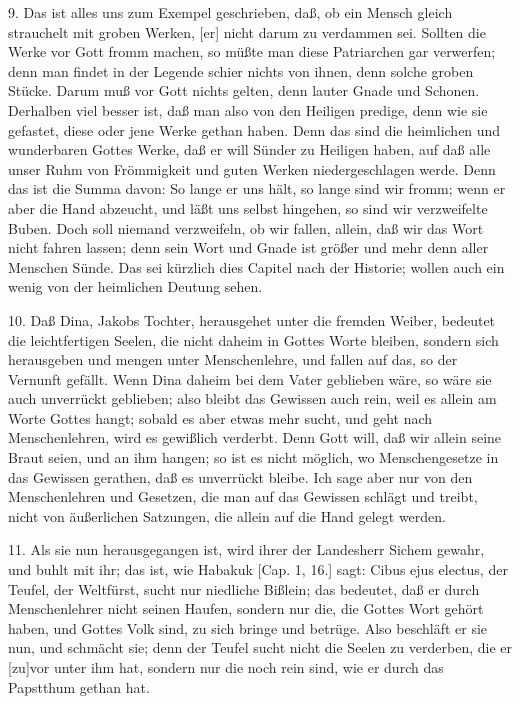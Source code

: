 9. Das ist alles uns zum Exempel geschrieben, daß, ob ein Mensch gleich strauchelt mit groben Werken, [er] nicht darum zu verdammen sei. Sollten die Werke vor Gott fromm machen, so müßte man diese Patriarchen gar verwerfen; denn man findet in der Legende schier nichts von ihnen, denn solche groben Stücke. Darum muß vor Gott nichts gelten, denn lauter Gnade und Schonen. Derhalben viel besser ist, daß man also von den Heiligen predige, denn wie sie gefastet, diese oder jene Werke gethan haben. Denn das sind die heimlichen und wunderbaren Gottes Werke, daß er will Sünder zu Heiligen haben, auf daß alle unser Ruhm von Frömmigkeit und guten Werken niedergeschlagen werde. Denn das ist die Summa davon: So lange er uns hält, so lange sind wir fromm; wenn er aber die Hand abzeucht, und läßt uns selbst hingehen, so sind wir verzweifelte Buben. Doch soll niemand verzweifeln, ob wir fallen, allein, daß wir das Wort nicht fahren lassen; denn sein Wort und Gnade ist größer und mehr denn aller Menschen Sünde. Das sei kürzlich dies Capitel nach der Historie; wollen auch ein wenig von der heimlichen Deutung sehen.

10. Daß Dina, Jakobs Tochter, herausgehet unter die fremden Weiber, bedeutet die leichtfertigen Seelen, die nicht daheim in Gottes Worte bleiben, sondern sich herausgeben und mengen unter Menschenlehre, und fallen auf das, so der Vernunft gefällt. Wenn Dina daheim bei dem Vater geblieben wäre, so wäre sie auch unverrückt geblieben; also bleibt das Gewissen auch rein, weil es allein am Worte Gottes hangt; sobald es aber etwas mehr sucht, und geht nach Menschenlehren, wird es gewißlich verderbt. Denn Gott will, daß wir allein seine Braut seien, und an ihm hangen; so ist es nicht möglich, wo Menschengesetze in das Gewissen gerathen, daß es unverrückt bleibe. Ich sage aber nur von den Menschenlehren und Gesetzen, die man auf das Gewissen schlägt und treibt, nicht von äußerlichen Satzungen, die allein auf die Hand gelegt werden.

11. Als sie nun herausgegangen ist, wird ihrer der Landesherr Sichem gewahr, und buhlt mit ihr; das ist, wie Habakuk [Cap. 1, 16.] sagt: Cibus ejus electus, der Teufel, der Weltfürst, sucht nur niedliche Bißlein; das bedeutet, daß er durch Menschenlehrer nicht seinen Haufen, sondern nur die, die Gottes Wort gehört haben, und Gottes Volk sind, zu sich bringe und betrüge. Also beschläft er sie nun, und schmächt sie; denn der Teufel sucht nicht die Seelen zu verderben, die er [zu]vor unter ihm hat, sondern nur die noch rein sind, wie er durch das Papstthum gethan hat.

